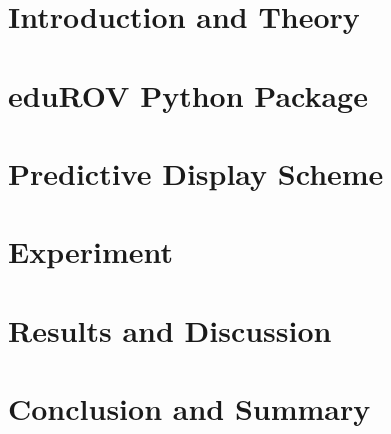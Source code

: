 \documentclass[b5paper,10pt,twoside,openright]{book}
\begin{document}
\newpage\null\thispagestyle{empty}\newpage

\begingroup
\let\cleardoublepage\clearpage






\endgroup
 
{
\tableofcontents

{}
\listoffigures
\cleardoublepage

{}
\listoftables
\cleardoublepage
}
{

\chapter{Introduction and Theory} \label{chpIntroduction}
		
	
\chapter{eduROV Python Package}\label{chpEdurov}
		
	
\chapter{Predictive Display Scheme}\label{chpPredictive}
		

\chapter{Experiment}\label{chpMethod}
		

\chapter{Results and Discussion}\label{chpResults}
	

\chapter{Conclusion and Summary}\label{chpConc}
	

{
}
\printbibliography[title=References]

\begin{appendices}\label{appendix}


\end{appendices}}
\end{document}
